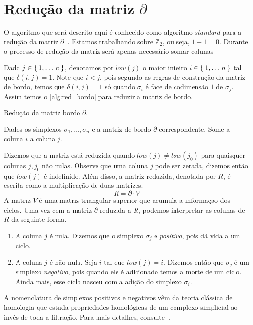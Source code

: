 \section{Redução da matriz $\partial$}
O algoritmo que será descrito aqui é conhecido como algoritmo \textit{standard}
para a redução da matriz $\partial$~\cite{Edelsbrunner2000}. Estamos trabalhando
sobre $\mathbb{Z}_2$, ou seja, $1+1 = 0$. Durante o processo de redução da matriz
será apenas necessário somar colunas.

Dado $j \in \Set{1,\dots\,n}$, denotamos por $low(j)$ o maior inteiro
$i \in \Set{1,\dots\,n} $ tal que $\delta(i,j)=1$. Note que $i < j$, pois segundo
as regras de construção da matriz de bordo, temos que $\delta(i,j) = 1$ só
quando $\sigma_i$ é face de codimensão $1$ de $\sigma_j$. Assim temos o
\autoref{alg:red_bordo} para reduzir a matriz de bordo.

\begin{algorithm}[!htpb]
  \caption{Redução da matriz bordo $\partial$.}
  \label{alg:red_bordo}
  \begin{algorithmic}[1]
    \State Dados os simplexos $\sigma_1, \dots, \sigma_n$ e a matriz de bordo
    $\partial$ correspondente.
        \State Some a coluna $i$ a coluna $j$.
      \EndWhile
    \EndFor
  \end{algorithmic}
\end{algorithm}

Dizemos que a matriz está reduzida quando $low(j) \neq low(j_0)$ para quaisquer
colunas $j,j_0$ não nulas. Observe que uma coluna $j$ pode ser zerada, dizemos
então que $low(j)$ é indefinido. Além disso, a matriz reduzida, denotada por
$R$, é escrita como a multiplicação de duas matrizes.
\begin{equation}
  \label{eq:red_matrix}
  R = \partial \cdot V
\end{equation}
A matriz $V$ é uma matriz triangular superior que acumula a informação dos
ciclos. Uma vez com a matriz $\partial$ reduzida a $R$, podemos interpretar as
colunas de $R$ da seguinte forma.
\begin{enumerate}
  \item A coluna $j$ é nula. Dizemos que o simplexo $\sigma_j$
  é \textit{positivo}, pois dá vida a um ciclo.
  \item A coluna $j$ é não-nula. Seja $i$ tal que $low(j)=i$.
  Dizemos então que $\sigma_j$ é um simplexo \textit{negativo}, pois quando
  ele é adicionado temos a morte de um ciclo. Ainda mais, esse ciclo nasceu com
  a adição do simplexo $\sigma_i$.
\end{enumerate}
A nomenclatura de simplexos positivos e negativos vêm da teoria clássica de homologia
que estuda propriedades homológicas de um complexo simplicial ao invés de toda
a filtração. Para mais detalhes, consulte~\cite{edelsbrunner2010computational}.

